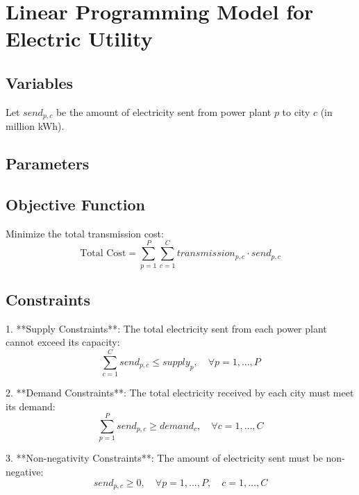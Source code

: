 \documentclass{article}
\begin{document}
\section*{Linear Programming Model for Electric Utility}

\subsection*{Variables}
Let \( send_{p,c} \) be the amount of electricity sent from power plant \( p \) to city \( c \) (in million kWh).

\subsection*{Parameters}

\subsection*{Objective Function}
Minimize the total transmission cost:
\[
\text{Total Cost} = \sum_{p=1}^{P} \sum_{c=1}^{C} transmission_{p,c} \cdot send_{p,c}
\]

\subsection*{Constraints}
1. **Supply Constraints**: The total electricity sent from each power plant cannot exceed its capacity:
   \[
   \sum_{c=1}^{C} send_{p,c} \leq supply_{p}, \quad \forall p = 1, \ldots, P
   \]

2. **Demand Constraints**: The total electricity received by each city must meet its demand:
   \[
   \sum_{p=1}^{P} send_{p,c} \geq demand_{c}, \quad \forall c = 1, \ldots, C
   \]

3. **Non-negativity Constraints**: The amount of electricity sent must be non-negative:
   \[
   send_{p,c} \geq 0, \quad \forall p = 1, \ldots, P, \quad c = 1, \ldots, C
   \]
\end{document}
